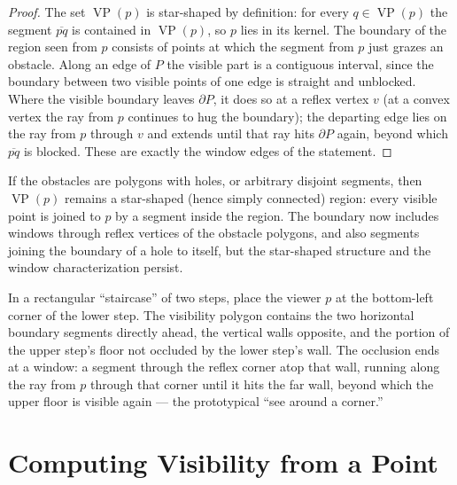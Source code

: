 \begin{proof}
  The set $\operatorname{VP}(p)$ is star-shaped by definition: for every
  $q \in \operatorname{VP}(p)$ the segment $\overline{pq}$ is contained in
  $\operatorname{VP}(p)$, so $p$ lies in its kernel. The boundary of the
  region seen from $p$ consists of points at which the segment from $p$
  just grazes an obstacle. Along an edge of $P$ the visible part is a
  contiguous interval, since the boundary between two visible points of one
  edge is straight and unblocked. Where the visible boundary leaves
  $\partial P$, it does so at a reflex vertex $v$ (at a convex vertex the
  ray from $p$ continues to hug the boundary); the departing edge lies on
  the ray from $p$ through $v$ and extends until that ray hits $\partial P$
  again, beyond which $\overline{pq}$ is blocked. These are exactly the
  window edges of the statement.
\end{proof}

\begin{remark}\label{rem:vis_holes}
  If the obstacles are polygons with holes, or arbitrary disjoint segments,
  then $\operatorname{VP}(p)$ remains a star-shaped (hence simply connected)
  region: every visible point is joined to $p$ by a segment inside the
  region. The boundary now includes windows through reflex vertices of the
  obstacle polygons, and also segments joining the boundary of a hole to
  itself, but the star-shaped structure and the window characterization
  persist.
\end{remark}

\begin{example}\label{exa:vis_staircase}
  In a rectangular ``staircase'' of two steps, place the viewer $p$ at the
  bottom-left corner of the lower step. The visibility polygon contains the
  two horizontal boundary segments directly ahead, the vertical walls
  opposite, and the portion of the upper step's floor not occluded by the
  lower step's wall. The occlusion ends at a window: a segment through the
  reflex corner atop that wall, running along the ray from $p$ through that
  corner until it hits the far wall, beyond which the upper floor is visible
  again --- the prototypical ``see around a corner.''
\end{example}


\section{Computing Visibility from a Point}
\label{sec:visibility_from_point}

